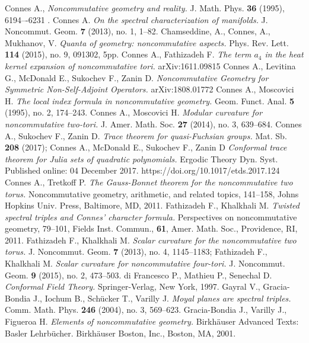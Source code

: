 \documentclass[12pt]{article}
\begin{document}
\begin{thebibliography}{99}
 Connes A., {\it Noncommutative geometry and reality.} J. Math. Phys. {\bf 36} (1995), 6194–-6231 .
 Connes A. {\it On the spectral characterization of manifolds.} J. Noncommut. Geom. {\bf 7} (2013), no. 1, 1--82.
 Chamseddine, A., Connes, A., Mukhanov, V. {\it Quanta of geometry: noncommutative aspects.} Phys. Rev. Lett. {\bf 114} (2015), no. 9, 091302, 5pp.
 Connes A., Fathizadeh F. {\it The term $a_4$ in the heat kernel expansion of noncommutative tori.} arXiv:1611.09815
 Connes A., Levitina G., McDonald E., Sukochev F., Zanin D. {\it Noncommutative Geometry for Symmetric Non-Self-Adjoint Operators.} arXiv:1808.01772 
 Connes A., Moscovici H. {\it The local index formula in noncommutative geometry.} Geom. Funct. Anal. {\bf 5} (1995), no. 2, 174--243.
 Connes A., Moscovici H. {\it Modular curvature for noncommutative two-tori.} J. Amer. Math. Soc. {\bf 27} (2014), no. 3, 639--684.
 Connes A., Sukochev F., Zanin D. {\it Trace theorem for quasi-Fuchsian groups.} Mat. Sb. {\bf 208} (2017); Connes A., McDonald E., Sukochev F., Zanin D {\it Conformal trace theorem for Julia sets of quadratic polynomials.} Ergodic Theory Dyn. Syst. Published online: 04 December 2017. https://doi.org/10.1017/etds.2017.124
 Connes A., Tretkoff P. {\it The Gauss-Bonnet theorem for the noncommutative two torus.} Noncommutative geometry, arithmetic, and related topics, 141--158, Johns Hopkins Univ. Press, Baltimore, MD, 2011.
 Fathizadeh F., Khalkhali M. {\it Twisted spectral triples and Connes' character formula.} Perspectives on noncommutative geometry, 79--101, Fields Inst. Commun., {\bf 61}, Amer. Math. Soc., Providence, RI, 2011.
 Fathizadeh F., Khalkhali M. {\it Scalar curvature for the noncommutative two torus.} J. Noncommut. Geom. {\bf 7} (2013), no. 4, 1145--1183; Fathizadeh F., Khalkhali M. {\it Scalar curvature for noncommutative four-tori.} J. Noncommut. Geom. {\bf 9} (2015), no. 2, 473--503.
 di Francesco P., Mathieu P., Senechal D. {\it Conformal Field Theory.} Springer-Verlag, New York, 1997.
 Gayral V., Gracia-Bondia J., Iochum B., Sch\"ucker T., Varilly J. {\it Moyal planes are spectral triples.} Comm. Math. Phys. {\bf 246} (2004), no. 3, 569--623.
 Gracia-Bondia J., Varilly J., Figueroa H. {\it Elements of noncommutative geometry.} Birkh\"auser Advanced Texts: Basler Lehrb\"ucher. Birkh\"auser Boston, Inc., Boston, MA, 2001.

\end{thebibliography}
\end{document}
